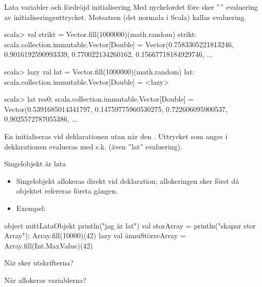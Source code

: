
\begin{Slide}{Lata variabler och fördröjd initialisering}
Med nyckelordet  före  sker '''' evaluering av initialiseringsuttrycket. Motsatsen (det normala i Scala) kallas  evaluering.
\begin{REPL}
scala> val strikt = Vector.fill(1000000)(math.random)
strikt: scala.collection.immutable.Vector[Double] =
 Vector(0.7583305221813246, 0.9016192590993339, 0.770022134260162, 0.15667718184929746, ...

scala> lazy val lat = Vector.fill(1000000)(math.random)
lat: scala.collection.immutable.Vector[Double] = <lazy>

scala> lat
res0: scala.collection.immutable.Vector[Double] =
  Vector(0.5391685014341797, 0.14759775960530275, 0.722606095900537, 0.9025572787055386, ...
\end{REPL}

En  initialiseras  vid deklarationen utan när den . Uttrycket som anges i deklarationen evalueras med s.k.  (även ''lat'' evaluering).
\end{Slide}




\begin{Slide}{Singelobjekt är lata}

\begin{itemize}
  \item Singelobjekt allokeras  direkt vid deklaration; allokeringen sker först då objektet refereras första gången.

\pause

  \item Exempel:

\end{itemize}

\begin{Code}
object mittLataObjekt {
  println("jag är lat")
  val storArray = { println("skapar stor Array"); Array.fill(10000)(42) }
  lazy val ännuStörreArray = Array.fill(Int.MaxValue)(42)
}
\end{Code}

När sker utskrifterna?

När allokeras variablerna?

\end{Slide}




